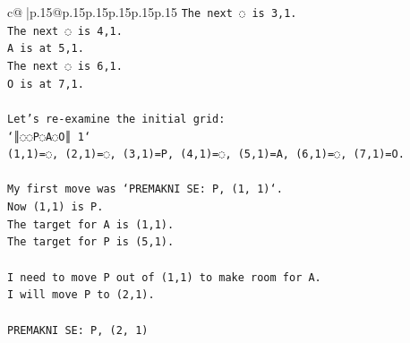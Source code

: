 \documentclass{article}
\begin{document}
{\begin{supertabular}{c@{$\;$}|p{.15\linewidth}@{}p{.15\linewidth}p{.15\linewidth}p{.15\linewidth}p{.15\linewidth}p{.15\linewidth}}
{{{\texttt{The next ◌ is 3,1.} \\
\texttt{The next ◌ is 4,1.} \\
\texttt{A is at 5,1.} \\
\texttt{The next ◌ is 6,1.} \\
\texttt{O is at 7,1.} \\
\\ 
\texttt{Let's re{-}examine the initial grid:} \\
\texttt{`║◌◌P◌A◌O║ 1`} \\
\texttt{(1,1)=◌, (2,1)=◌, (3,1)=P, (4,1)=◌, (5,1)=A, (6,1)=◌, (7,1)=O.} \\
\\ 
\texttt{My first move was `PREMAKNI SE: P, (1, 1)`.} \\
\texttt{Now (1,1) is P.} \\
\texttt{The target for A is (1,1).} \\
\texttt{The target for P is (5,1).} \\
\\ 
\texttt{I need to move P out of (1,1) to make room for A.} \\
\texttt{I will move P to (2,1).} \\
\\ 
\texttt{PREMAKNI SE: P, (2, 1)} \\
            }
        }
    }
     \\ \\


\end{supertabular}}
\end{document}

